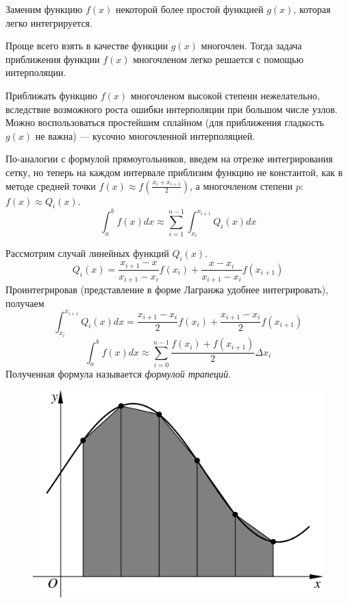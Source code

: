 \documentclass[professionalfonts,compress,unicode]{beamer}
\begin{document}
{
	Заменим функцию $f(x)$ некоторой более простой функцией $g(x)$, которая легко 
	интегрируется.
	\pause
	
	Проще всего взять в качестве функции $g(x)$ многочлен. Тогда задача приближения 
	функции $f(x)$ многочленом легко решается с помощью интерполяции. 
	\pause
	
	Приближать функцию $f(x)$ многочленом высокой степени нежелательно, 
	вследствие возможного роста ошибки интерполяции при большом числе узлов. 
	Можно воспользоваться простейшим сплайном (для приближения гладкость $g(x)$ не важна) ---
	кусочно многочленной интерполяцией.
}

{
	По-аналогии с формулой прямоугольников, введем на отрезке интегрирования сетку, но теперь на каждом
	интервале приблизим функцию не константой, как в методе средней точки $f(x) \approx f\left(\frac{x_i+x_{i+1}}{2}\right)$,
	а многочленом степени $p$: $f(x) \approx Q_i(x)$.
	$$
	\int_a^b f(x) dx\approx \sum_{i=1}^{n-1} \int_{x_i}^{x_{i+1}} Q_i(x) dx
	$$
}

{
	Рассмотрим случай линейных функций $Q_i(x)$. 
	$$
	Q_i(x) = 
	\frac{x_{i+1}-x}{x_{i+1}-x_i} f(x_i) + \frac{x-x_i}{x_{i+1}-x_i} f(x_{i+1})
	$$
	\pause
	Проинтегрировав (представление в форме Лагранжа удобнее интегрировать), получаем
	$$
	\int_{x_i}^{x_{i+1}} Q_i(x) dx = \frac{x_{i+1}-x_i}{2} f(x_i) + \frac{x_{i+1}-x_i}{2} f(x_{i+1})
	$$
	$$
	\int_a^b f(x) dx \approx \sum_{i=0}^{n-1} \frac{f(x_i)+f(x_{i+1})}{2} \Delta x_i
	$$
	Полученная формула называется \emph{формулой трапеций}.
}

{
	\begin{figure}%
	\includegraphics[width=\columnwidth]{trap.pdf}%
	\end{figure}
}
\end{document}
